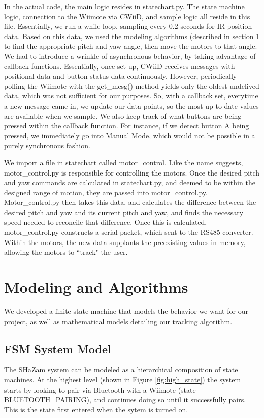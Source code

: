 \documentclass[conference, twocolumn]{IEEEtran}
\begin{document}
In the actual code, the main logic resides in statechart.py. The state machine logic, connection to the Wiimote via CWiiD, and sample logic all reside in this file. Essentially, we run a while loop, sampling every 0.2 seconds for IR position data. Based on this data, we used the modeling algorithms (described in section \ref{sec:algorithms} to find the appropriate pitch and yaw angle, then move the motors to that angle. We had to introduce a wrinkle of asynchronous behavior, by taking advantage of callback functions. Essentially, once set up, CWiiD receives messages with positional data and button status data continuously. However, periodically polling the Wiimote with the get\_mesg() method yields only the oldest undelived data, which was not sufficient for our purposes. So, with a callback set, everytime a new message came in, we update our data points, so the most up to date values are available when we sample. We also keep track of what buttons are being pressed within the callback function. For instance, if we detect button A being pressed, we immediately go into Manual Mode, which would not be possible in a purely synchronous fashion. 

We import a file in statechart called motor\_control. Like the name suggests, motor\_control.py is responsible for controlling the motors. Once the desired pitch and yaw commands are calculated in statechart.py, and deemed to be within the designed range of motion, they are passed into motor\_control.py. Motor\_control.py then takes this data, and calculates the difference between the desired pitch and yaw and its current pitch and yaw, and finds the necessary speed needed to reconcile that difference. Once this is calculated, motor\_control.py constructs a serial packet, which sent to the RS485 converter. Within the motors, the new data supplants the preexisting values in memory, allowing the motors to ``track" the user.

\section{Modeling and Algorithms}
\label{sec:algorithms}
We developed a finite state machine that models the behavior we want for our project, as well as mathematical models detailing our tracking algorithm.
 
 \subsection{FSM System Model}
 The SHaZam system can be modeled as a hierarchical composition of state machines. At the highest level (shown in Figure \ref{fig:high_state}) the system starts by looking to pair via Bluetooth with a Wiimote (state BLUETOOTH\_PAIRING), and continues doing so until it successfully pairs. This is the state first entered when the sytem is turned on.
 
\end{document}
